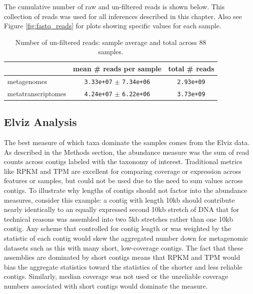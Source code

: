 The cumulative number of raw and un-filtered reads is shown below.
This collection of reads was used for all inferences described in this chapter.
Also see Figure \ref{fig:fastq_reads} for plots showing specific values for each sample.

\begin{table}[H]
\centering
\begin{singlespace}
\caption[Number of un-filtered reads: sample average and total]
	{Number of un-filtered reads: sample average and total across 88 samples.
	}
\begin{tabular}{l | cc}
        & mean \# reads per sample & total \# reads \\
\midrule
	metagenomes & \texttt{3.33e+07} $\pm$ \texttt{7.34e+06} & \texttt{2.93e+09} \\ %
	metatranscriptomes & \texttt{4.24e+07} $\pm$ \texttt{6.22e+06} &  \texttt{3.73e+09} \\
\end{tabular}
\label{table:sample_read_sizes}
\end{singlespace}
\end{table}



\subsection{Elviz Analysis}    %
\label{results:elviz}

The best measure of which taxa dominate the samples comes from the Elviz \cite{cantor2015} data.
As described in the Methods section, the abundance measure was the sum of read counts across contigs labeled with the taxonomy of interest.
Traditional metrics like RPKM \cite{mortazavi2008} and TPM \cite{wagner2012} are excellent for comparing coverage or expression across features or samples, but could not be used due to the need to sum values across contigs.
To illustrate why lengths of contigs should not factor into the abundance measures, consider this example:
a contig with length 10kb should contribute nearly identically to an equally expressed second 10kb stretch of DNA that for technical reasons was assembled into two 5kb stretches rather than one 10kb contig.
Any scheme that controlled for contig length or was weighted by the statistic of each contig would skew the aggregated number down for metagenomic datasets such as this with many short, low-coverage contigs.
The fact that these assemblies are dominated by short contigs means that RPKM and TPM would bias the aggregate statistics toward the statistics of the shorter and less reliable contigs.
Similarly, median coverage was not used or the unreliable coverage numbers associated with short contigs would dominate the measure.

